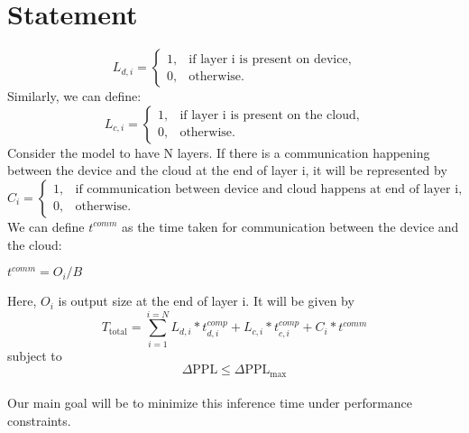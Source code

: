 \documentclass{article}
\begin{document}
\section{Statement}
\[
L_{d,i} =
\begin{cases} 
    1, & \text{if layer i is present on device}, \\
    0, & \text{otherwise}.
\end{cases}
\tag{1}
\]
Similarly, we can define:
\[
L_{c,i} =
\begin{cases} 
    1, & \text{if layer i is present on the cloud}, \\
    0, & \text{otherwise}.
\end{cases}
\tag{2}
\]
Consider the model to have N layers. 
If there is a communication happening between the device and the cloud at the end of layer i, it will be represented by
\[
C_i =
\begin{cases} 
    1, & \text{if communication between device and cloud happens at end of layer i}, \\
    0, & \text{otherwise}.
\end{cases}
\tag{3}
\]
We can define $t^{comm}$ as the time taken for communication between the device and the cloud:

$    t^{comm} = O_i / B $

Here, $O_i$ is output size at the end of layer i. It will be given by 
\[
T_{\text{total}} = \sum_{i = 1}^{i = N} L_{d,i} * t^{comp}_{d, i} + L_{c, i} * t^{comp}_{c, i} + C_i * t^{comm}
\]
subject to \\
\[
\Delta \text{PPL} \leq \Delta \text{PPL}_{\text{max}}
\]
\\
Our main goal will be to minimize this inference time under performance constraints. 
\end{document}
